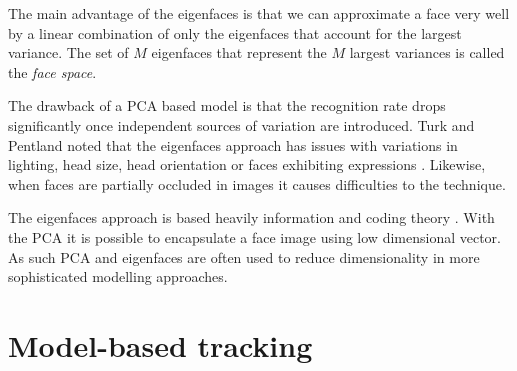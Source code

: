 \documentclass[11pt,a4paper]{book}
\begin{document}
The main advantage of the eigenfaces is that we can approximate a face very well
by a linear combination of only the eigenfaces that account for the largest
variance. The set of $M$ eigenfaces that represent the $M$ largest variances is called
the \textit{face space}.

The drawback of a PCA based model is that the recognition rate drops significantly once
independent sources of variation are introduced. Turk and
Pentland noted that the eigenfaces approach has issues with variations in lighting,
head size, head orientation or faces exhibiting expressions \cite{eigenfaces91}. Likewise, when
faces are partially occluded in images it causes difficulties to the technique. 

The eigenfaces approach is based heavily information and coding theory
\cite{eigenfaces91}. With the PCA it is possible to encapsulate a face image
using low dimensional vector. As such PCA and eigenfaces are often used to
reduce dimensionality in more sophisticated modelling approaches.

\section{Model-based tracking}




\end{document}
